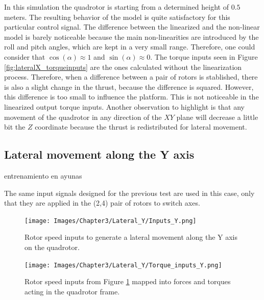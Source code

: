 In this simulation the quadrotor is starting from a determined height of $0.5$ meters. The resulting behavior of the model is quite satisfactory for this particular control signal. The difference between the linearized and the non-linear model is barely noticeable because the main non-linearities are introduced by the roll and pitch angles, which are kept in a very small range. Therefore, one could consider that $\cos{(\alpha)} \approx 1$ and $\sin{(\alpha)} \approx 0$. The torque inputs seen in Figure \ref{fig:lateralX_torqueinputs} are the ones calculated without the linearization process. Therefore, when a difference between a pair of rotors is stablished, there is also a slight change in the thrust, because the difference is squared. However, this difference is too small to influence the platform. This is not noticeable in the linearized output torque inputs. Another observation to highlight is that any movement of the quadrotor in any direction of the $XY$ plane will decrease a little bit the $Z$ coordinate because the thrust is redistributed for lateral movement. \newpage

\subsection{Lateral movement along the Y axis}entrenamiento en ayunas

The same input signals designed for the previous test are used in this case, only that they are applied in the (2,4) pair of rotors to switch axes.

\begin{figure}[H]
\centering
\texttt{[image: Images/Chapter3/Lateral\_Y/Inputs\_Y.png]}
\caption{Rotor speed inputs to generate a lateral movement along the Y axis on the quadrotor.}
\label{fig:lateralY_inputs}
\end{figure}

\begin{figure}[H]
\centering
\texttt{[image: Images/Chapter3/Lateral\_Y/Torque\_inputs\_Y.png]}
\caption{Rotor speed inputs from Figure \ref{fig:lateralY_inputs} mapped into forces and torques acting in the quadrotor frame.}
\label{fig:lateralY_torqueinputs}
\end{figure}


